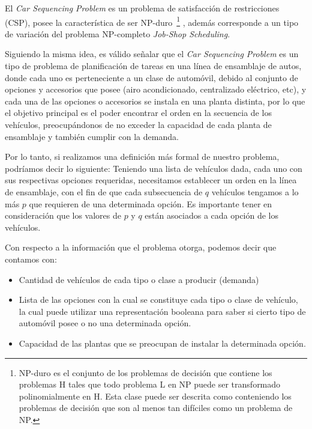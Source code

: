 
El \emph{Car Sequencing Problem} es un problema de satisfacción de restricciones (CSP), posee la
característica de ser NP-duro~\footnote{
NP-duro es el conjunto de los problemas de decisión que contiene los problemas H
tales que todo problema L en NP puede ser transformado polinomialmente en H.
Esta clase puede ser descrita como conteniendo los problemas de decisión que son
al menos tan difíciles como un problema de NP.}
, además corresponde a un tipo de variación del problema NP-completo \emph{Job-Shop Scheduling}.%
 
Siguiendo la misma idea, es válido señalar que el \emph{Car Sequencing Problem} es un tipo de problema de planificación
de tareas en una línea de ensamblaje de autos, donde cada uno es perteneciente a un clase de automóvil, debido al conjunto
de opciones y accesorios que posee (airo acondicionado, centralizado eléctrico, etc), y cada una de las opciones o
accesorios se instala en una planta distinta, por lo que el objetivo principal es el poder encontrar el orden en la
secuencia de los vehículos, preocupándonos de no exceder la capacidad de cada planta de ensamblaje y también cumplir con la demanda.

Por lo tanto, si realizamos una definición más formal de nuestro problema, podríamos decir lo siguiente:
Teniendo una lista de vehículos dada, cada uno con sus respectivas opciones requeridas,
necesitamos establecer un orden en la línea de ensamblaje, con el fin de que cada subsecuencia de $q$ vehículos
tengamos a lo más $p$ que requieren de una determinada opción. Es importante tener en consideración que los
valores de $p$ y $q$ están asociados a cada opción de los vehículos.

Con respecto a la información que el problema otorga, podemos decir que contamos con:
\begin{itemize}
	\item Cantidad de vehículos de cada tipo o clase a producir (demanda)
	\item Lista de las opciones con la cual se constituye cada tipo o clase de vehículo, la cual puede utilizar una representación
		booleana para saber si cierto tipo de automóvil posee o no una determinada opción.
	\item Capacidad de las plantas que se preocupan de instalar la determinada opción.
\end{itemize}

